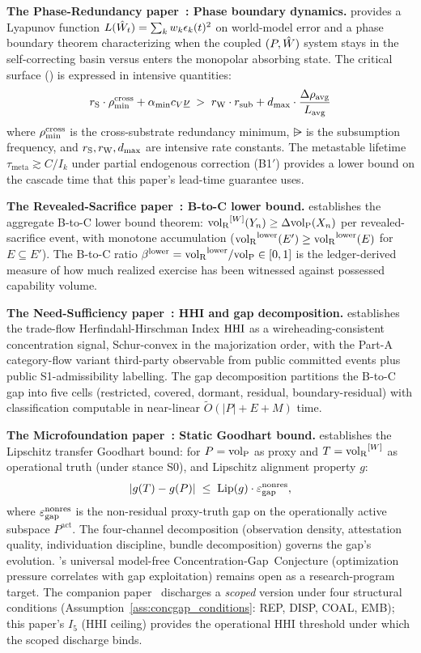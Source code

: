 \textbf{The Phase-Redundancy paper~\citep{lasser2026phase}: Phase boundary dynamics.}
\citep{lasser2026phase} provides a Lyapunov function $L(\hat{W}_t) = \sum_k w_k
\epsilon_k(t)^2$ on world-model error and a phase boundary theorem
characterizing when the coupled $(P, \hat{W})$ system stays in the self-correcting
basin versus enters the monopolar absorbing state. The critical surface
(\citep[Equation 7 (critical surface)]{lasser2026phase}) is expressed in
intensive quantities:
\[
  r_{\mathrm{S}} \cdot \rho_{\min}^{\mathrm{cross}} + \alpha_{\min} c_V \underline{\nu}
  \;>\; r_{\mathrm{W}} \cdot r_{\mathrm{sub}} + d_{\max} \cdot
  \frac{\Delta\rho_{\mathrm{avg}}}{L_{\mathrm{avg}}}
\]
where $\rho_{\min}^{\mathrm{cross}}$ is the cross-substrate redundancy minimum, $\rsub$ is the
subsumption frequency, and $r_{\mathrm{S}}, r_{\mathrm{W}}, d_{\max}$ are intensive rate constants. The
metastable lifetime $\tau_{\mathrm{meta}} \gtrsim C/I_k$ under partial
endogenous correction (B1$'$) provides a lower bound on the cascade time that
this paper's lead-time guarantee uses.

\textbf{The Revealed-Sacrifice paper~\citep{lasser2026paper8a}: B-to-C lower bound.}
\citep{lasser2026paper8a} establishes the aggregate B-to-C lower bound theorem:
${\operatorname{vol}_{\mathrm{R}}}^{[W]}(Y_n) \geq \Delta{\operatorname{vol}_{\mathrm{P}}}(X_n)$ per revealed-sacrifice event, with
monotone accumulation (${\operatorname{vol}_{\mathrm{R}}}^{\mathrm{lower}}(E') \geq {\operatorname{vol}_{\mathrm{R}}}^{\mathrm{lower}}(E)$ for $E \subseteq
E'$). The B-to-C ratio $\beta^{\mathrm{lower}} = {\operatorname{vol}_{\mathrm{R}}}^{\mathrm{lower}} / {\operatorname{vol}_{\mathrm{P}}} \in [0, 1]$ is the
ledger-derived measure of how much realized exercise has been witnessed against
possessed capability volume.

\textbf{The Need-Sufficiency paper~\citep{lasser2026paper8b}: HHI and gap decomposition.}
\citep{lasser2026paper8b} establishes the trade-flow Herfindahl-Hirschman Index
$\mathrm{HHI}$ as a wireheading-consistent concentration signal, Schur-convex in the
majorization order, with the Part-A category-flow variant third-party
observable from public committed events plus public S1-admissibility labelling.
The gap decomposition partitions the B-to-C gap into five cells (restricted,
covered, dormant, residual, boundary-residual) with classification computable
in near-linear $\widetilde{O}(|P|+E+M)$ time.

\textbf{The Microfoundation paper~\citep{lasser2026micro}: Static Goodhart bound.}
\citep{lasser2026micro} establishes the Lipschitz transfer Goodhart
bound: for $P = {\operatorname{vol}_{\mathrm{P}}}$ as proxy and $T = {\operatorname{vol}_{\mathrm{R}}}^{[W]}$ as
operational truth (under stance S0), and Lipschitz alignment
property $g$:
\[
  |g(T) - g(P)| \;\leq\; \mathrm{Lip}(g) \cdot \varepsilon_{\mathrm{gap}}^{\mathrm{nonres}},
\]
where $\varepsilon_{\mathrm{gap}}^{\mathrm{nonres}}$ is the non-residual proxy-truth gap on the operationally
active subspace $P^{\mathrm{act}}$. The four-channel decomposition (observation
density, attestation quality, individuation discipline, bundle decomposition)
governs the gap's evolution. \citep[Microfoundation]{lasser2026micro}'s
universal model-free Concentration-Gap~Conjecture (optimization pressure
correlates with gap exploitation) remains open as a research-program
target. The companion paper~\citep{lasser2026foundations} discharges a
\emph{scoped} version under four structural conditions
(Assumption~\ref{ass:concgap_conditions}: REP, DISP, COAL, EMB);
this paper's $I_5$ (HHI ceiling) provides the operational HHI
threshold under which the scoped discharge binds.

